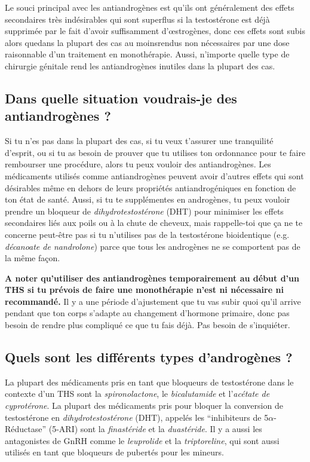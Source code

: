 \documentclass{article}
\begin{document}
Le souci principal avec les antiandrogènes est qu'ils ont généralement des effets secondaires très indésirables qui sont superflus si la testostérone est déjà supprimée par le fait d'avoir suffisamment d'œstrogènes, donc ces effets sont subis alors que\textemdash{}dans la plupart des cas au moins\textemdash{}rendus non nécessaires par une dose raisonnable d'un traitement en monothérapie. Aussi, n'importe quelle type de chirurgie génitale rend les antiandrogènes inutiles dans la plupart des cas. 

\subsection{Dans quelle situation voudrais-je des antiandrogènes ?}

Si tu n'es pas dans la plupart des cas, si tu veux t'assurer une tranquilité d'esprit, ou si tu as besoin de prouver que tu utilises ton ordonnance pour te faire rembourser une procédure, alors tu peux vouloir des antiandrogènes. Les médicaments utilisés comme antiandrogènes peuvent avoir d'autres effets qui sont désirables même en dehors de leurs propriétés antiandrogéniques en fonction de ton état de santé. Aussi, si tu te supplémentes en androgènes, tu peux vouloir prendre un bloqueur de \textit{dihydrotestostérone} (DHT) pour minimiser les effets secondaires liés aux poils ou à la chute de cheveux, mais rappelle-toi que ça ne te concerne peut-être pas si tu n'utilises pas de la testostérone bioidentique (e.g. \textit{décanoate de nandrolone}) parce que tous les androgènes ne se comportent pas de la même façon. 

\textbf{A noter qu'utiliser des antiandrogènes temporairement au début d'un THS si tu prévois de faire une monothérapie n'est ni nécessaire ni recommandé.} Il y a une période d'ajustement que tu vas subir quoi qu'il arrive pendant que ton corps s'adapte au changement d'hormone primaire, donc pas besoin de rendre plus compliqué ce que tu fais déjà. Pas besoin de s'inquiéter.

\subsection{Quels sont les différents types d'androgènes ?}

La plupart des médicaments pris en tant que bloqueurs de testostérone dans le contexte d'un THS sont la \textit{spironolactone}, le \textit{bicalutamide} et l'\textit{acétate de cyprotérone}. La plupart des médicaments pris pour bloquer la conversion de testostérone en \textit{dihydrotestostérone} (DHT), appelés les “inhibiteurs de 5$\alpha$-Réductase” (5-ARI) sont la \textit{finastéride} et la \textit{duastéride}. Il y a aussi les antagonistes de GnRH comme le \textit{leuprolide} et la \textit{triptoreline}, qui sont aussi utilisés en tant que bloqueurs de pubertés pour les mineurs. 
\end{document}
